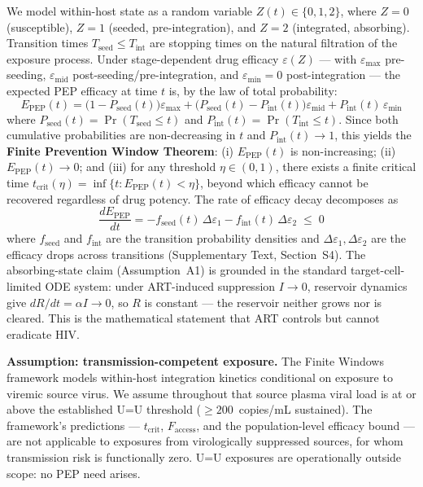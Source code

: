 \documentclass[10pt,letterpaper]{article}
\theoremstyle{definition}
\theoremstyle{remark}
\newcommand{\Tseed}{T_{\text{seed}}}
\newcommand{\Tint}{T_{\text{int}}}
\newcommand{\Pseed}{P_{\text{seed}}}
\newcommand{\Pint}{P_{\text{int}}}
\newcommand{\Epep}{E_{\text{PEP}}}
\newcommand{\Faccess}{F_{\text{access}}}
\newcommand{\tcrit}{t_{\text{crit}}}
\newcommand{\emax}{\varepsilon_{\max}}
\newcommand{\emid}{\varepsilon_{\text{mid}}}
\newcommand{\emin}{\varepsilon_{\min}}
\begin{document}
We model within-host state as a random variable $Z(t) \in \{0, 1, 2\}$, where $Z=0$ (susceptible), $Z=1$ (seeded, pre-integration), and $Z=2$ (integrated, absorbing). Transition times $\Tseed \leq \Tint$ are stopping times on the natural filtration of the exposure process. Under stage-dependent drug efficacy $\varepsilon(Z)$ --- with $\emax$ pre-seeding, $\emid$ post-seeding/pre-integration, and $\emin = 0$ post-integration --- the expected PEP efficacy at time $t$ is, by the law of total probability:
\begin{equation}
\Epep(t) = \big(1 - \Pseed(t)\big)\emax + \big(\Pseed(t) - \Pint(t)\big)\emid + \Pint(t)\,\emin
\label{eq:master}
\end{equation}
where $\Pseed(t) = \Pr(\Tseed \leq t)$ and $\Pint(t) = \Pr(\Tint \leq t)$. Since both cumulative probabilities are non-decreasing in $t$ and $\Pint(t) \to 1$, this yields the \textbf{Finite Prevention Window Theorem}: (i) $\Epep(t)$ is non-increasing; (ii) $\Epep(t) \to 0$; and (iii) for any threshold $\eta \in (0,1)$, there exists a finite critical time $\tcrit(\eta) = \inf\{t : \Epep(t) < \eta\}$, beyond which efficacy cannot be recovered regardless of drug potency. The rate of efficacy decay decomposes as
\begin{equation}
\frac{d\Epep}{dt} = -f_{\text{seed}}(t)\,\Delta\varepsilon_{1} - f_{\text{int}}(t)\,\Delta\varepsilon_{2} \;\leq\; 0
\label{eq:hazard}
\end{equation}
where $f_{\text{seed}}$ and $f_{\text{int}}$ are the transition probability densities and $\Delta\varepsilon_{1}, \Delta\varepsilon_{2}$ are the efficacy drops across transitions (Supplementary Text, Section~S4). The absorbing-state claim (Assumption~A1) is grounded in the standard target-cell-limited ODE system\cite{perelson1996}: under ART-induced suppression $I \to 0$, reservoir dynamics give $dR/dt = \alpha I \to 0$, so $R$ is constant --- the reservoir neither grows nor is cleared. This is the mathematical statement that ART controls but cannot eradicate HIV.

\textbf{Assumption: transmission-competent exposure.} The Finite Windows framework models within-host integration kinetics conditional on exposure to viremic source virus. We assume throughout that source plasma viral load is at or above the established U=U threshold ($\geq 200$~copies/mL sustained). The framework's predictions --- $\tcrit$, $\Faccess$, and the population-level efficacy bound --- are not applicable to exposures from virologically suppressed sources, for whom transmission risk is functionally zero\cite{rodger2019,bavinton2018}. U=U exposures are operationally outside scope: no PEP need arises.
\end{document}
